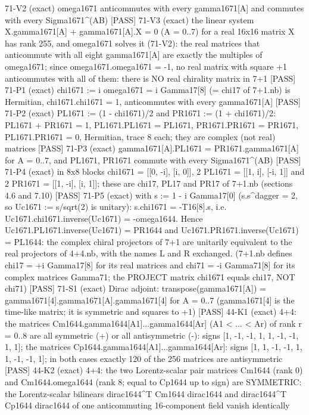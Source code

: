 \documentclass[
  10pt,
]{article}
\newenvironment{Shaded}{}{}
\newcommand{\NormalTok}[1]{#1}
\begin{document}
\begin{Shaded}
\begin{Highlighting}[]
\NormalTok{[PASS] 71{-}V2  (exact) omega1671 anticommutes with every gamma1671[A] and commutes with every Sigma1671\^{}(AB)}
\NormalTok{[PASS] 71{-}V3  (exact) the linear system X.gamma1671[A] + gamma1671[A].X = 0 (A = 0..7) for a real 16x16 matrix X has rank 255, and omega1671 solves it (71{-}V2): the real matrices that anticommute with all eight gamma1671[A] are exactly the multiples of omega1671; since omega1671.omega1671 = {-}1, no real matrix with square +1 anticommutes with all of them: there is NO real chirality matrix in 7+1}
\NormalTok{[PASS] 71{-}P1  (exact) chi1671 := i omega1671 = i Gamma17[8] (= chi17 of 7+1.nb) is Hermitian, chi1671.chi1671 = 1, anticommutes with every gamma1671[A]}
\NormalTok{[PASS] 71{-}P2  (exact) PL1671 := (1 {-} chi1671)/2 and PR1671 := (1 + chi1671)/2: PL1671 + PR1671 = 1, PL1671.PL1671 = PL1671, PR1671.PR1671 = PR1671, PL1671.PR1671 = 0, Hermitian, trace 8 each; they are complex (not real) matrices}
\NormalTok{[PASS] 71{-}P3  (exact) gamma1671[A].PL1671 = PR1671.gamma1671[A] for A = 0..7, and PL1671, PR1671 commute with every Sigma1671\^{}(AB)}
\NormalTok{[PASS] 71{-}P4  (exact) in 8x8 blocks chi1671 = [[0, {-}i], [i, 0]], 2 PL1671 = [[1, i], [{-}i, 1]] and 2 PR1671 = [[1, {-}i], [i, 1]]; these are chi17, PL17 and PR17 of 7+1.nb (sections 4.6 and 7.10)}
\NormalTok{[PASS] 71{-}P5  (exact) with s := 1 {-} i Gamma17[0] (s.s\^{}dagger = 2, so Uc1671 := s/sqrt(2) is unitary): s.chi1671 = {-}T16[8].s, i.e. Uc1671.chi1671.inverse(Uc1671) = {-}omega1644.  Hence Uc1671.PL1671.inverse(Uc1671) = PR1644 and Uc1671.PR1671.inverse(Uc1671) = PL1644: the complex chiral projectors of 7+1 are unitarily equivalent to the real projectors of 4+4.nb, with the names L and R exchanged.  (7+1.nb defines chi17 = +i Gamma17[8] for its real matrices and chi71 = {-}i Gamma71[8] for its complex matrices Gamma71; the PROJECT matrix chi1671 equals chi17, NOT chi71)}
\NormalTok{[PASS] 71{-}S1  (exact) Dirac adjoint: transpose(gamma1671[A]) = gamma1671[4].gamma1671[A].gamma1671[4] for A = 0..7 (gamma1671[4] is the time{-}like matrix; it is symmetric and squares to +1)}
\NormalTok{[PASS] 44{-}K1  (exact) 4+4: the matrices Cm1644.gamma1644[A1]...gamma1644[Ar] (A1 \textless{} ... \textless{} Ar) of rank r = 0..8 are all symmetric (+) or all antisymmetric ({-}): signs [1, {-}1, {-}1, 1, 1, {-}1, {-}1, 1, 1]; the matrices Cp1644.gamma1644[A1]...gamma1644[Ar]: signs [1, 1, {-}1, {-}1, 1, 1, {-}1, {-}1, 1]; in both cases exactly 120 of the 256 matrices are antisymmetric}
\NormalTok{[PASS] 44{-}K2  (exact) 4+4: the two Lorentz{-}scalar pair matrices Cm1644 (rank 0) and Cm1644.omega1644 (rank 8; equal to Cp1644 up to sign) are SYMMETRIC: the Lorentz{-}scalar bilinears dirac1644\^{}T Cm1644 dirac1644 and dirac1644\^{}T Cp1644 dirac1644 of one anticommuting 16{-}component field vanish identically}

\end{Highlighting}
\end{Shaded}
\end{document}
